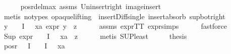 \begin{isabellebody}
\ \ \ \ \isamarkupfalse%
\ pos{\isacharunderscore}{\kern0pt}r{\isacharunderscore}{\kern0pt}del{\isacharunderscore}{\kern0pt}max\ assms{\isacharparenleft}{\kern0pt}{}{\isacharparenright}{\kern0pt}\ Un{\isacharunderscore}{\kern0pt}insert{\isacharunderscore}{\kern0pt}right\ image{\isacharunderscore}{\kern0pt}insert\isanewline
\ \ \ \ \isamarkupfalse%
\ {\isacharparenleft}{\kern0pt}metis\ {\isacharparenleft}{\kern0pt}no{\isacharunderscore}{\kern0pt}types{\isacharcomma}{\kern0pt}\ opaque{\isacharunderscore}{\kern0pt}lifting{\isacharparenright}{\kern0pt}\ \ insert{\isacharunderscore}{\kern0pt}Diff{\isacharunderscore}{\kern0pt}single\ insert{\isacharunderscore}{\kern0pt}absorb\ sup{\isacharunderscore}{\kern0pt}bot{\isacharunderscore}{\kern0pt}right{\isacharparenright}{\kern0pt}\isanewline
\ \ \isamarkupfalse%
\ {\isachardoublequoteopen}{\isasymforall}y\ {\isasymin}\ {\isacharparenleft}{\kern0pt}{\isasymPhi}\ {\isacharbackquote}{\kern0pt}\ I{\isacharparenright}{\kern0pt}\ {\isacharminus}{\kern0pt}\ {\isacharbraceleft}{\kern0pt}{\isasymPhi}\ xa{\isacharbraceright}{\kern0pt}{\isachardot}{\kern0pt}\ expr{\isacharunderscore}{\kern0pt}{}\ y\ {\isasymle}\ z{\isachardoublequoteclose}\isanewline
\ \ \ \ \isamarkupfalse%
\ assms{\isacharparenleft}{\kern0pt}{}{\isacharparenright}{\kern0pt}\ expr{\isacharunderscore}{\kern0pt}TT\ expr{\isachardot}{\kern0pt}simps\isanewline
\ \ \ \ \isamarkupfalse%
\ fastforce\isanewline
\ \ \isamarkupfalse%
\ {\isachardoublequoteopen}Sup\ {\isacharparenleft}{\kern0pt}expr{\isacharunderscore}{\kern0pt}{}\ {\isacharbackquote}{\kern0pt}\ {\isacharparenleft}{\kern0pt}{\isacharparenleft}{\kern0pt}{\isasymPhi}\ {\isacharbackquote}{\kern0pt}\ I{\isacharparenright}{\kern0pt}\ {\isacharminus}{\kern0pt}\ {\isacharbraceleft}{\kern0pt}{\isasymPhi}\ xa{\isacharbraceright}{\kern0pt}{\isacharparenright}{\kern0pt}{\isacharparenright}{\kern0pt}\ {\isasymle}\ z{\isachardoublequoteclose}\isanewline
\ \ \ \ \isamarkupfalse%
\ {\isacharparenleft}{\kern0pt}metis\ SUP{\isacharunderscore}{\kern0pt}least{\isacharparenright}{\kern0pt}\isanewline
\ \ \isamarkupfalse%
\ \isamarkupfalse%
\ {\isacharquery}{\kern0pt}thesis\ \isamarkupfalse%
\ {\isacartoucheopen}{\isacharparenleft}{\kern0pt}pos{\isacharunderscore}{\kern0pt}r\ {\isacharparenleft}{\kern0pt}{\isasymPhi}\ {\isacharbackquote}{\kern0pt}\ I{\isacharparenright}{\kern0pt}{\isacharparenright}{\kern0pt}\ {\isacharequal}{\kern0pt}\ {\isacharparenleft}{\kern0pt}{\isasymPhi}\ {\isacharbackquote}{\kern0pt}\ I{\isacharparenright}{\kern0pt}\ {\isacharminus}{\kern0pt}\ {\isacharbraceleft}{\kern0pt}{\isasymPhi}\ xa{\isacharbraceright}{\kern0pt}{\isacartoucheclose}\isanewline

\end{isabellebody}
